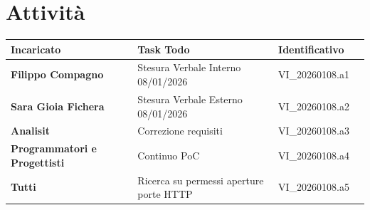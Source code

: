 \documentclass[a4paper,12pt]{article}
\begin{document}
\section{Attività}
\begin{tabularx}{\textwidth}{|l|X|l|l|}
    \hline
    \textbf{Incaricato} & \textbf{Task Todo} & \textbf{Identificativo} \\
    \hline
    \textbf{Filippo Compagno} & Stesura Verbale Interno 08/01/2026 & VI\_20260108.a1 \\
    \hline
    \textbf{Sara Gioia Fichera} & Stesura Verbale Esterno 08/01/2026 & VI\_20260108.a2 \\
    \hline
    \textbf{Analisit} & Correzione requisiti & VI\_20260108.a3  \\
    \hline
    \textbf{Programmatori e Progettisti} & Continuo PoC & VI\_20260108.a4 \\
    \hline
    \textbf{Tutti} & Ricerca su permessi aperture porte HTTP & VI\_20260108.a5 \\
    \hline
\end{tabularx}
\end{document}
